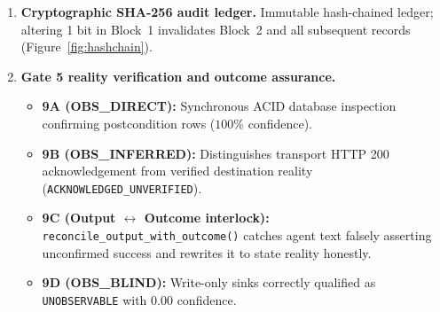 \documentclass[11pt,a4paper]{article}
\begin{document}
\begin{enumerate}[leftmargin=*,itemsep=2pt]
  \item \textbf{Cryptographic SHA-256 audit ledger.} Immutable hash-chained ledger; altering 1 bit in Block~1 invalidates Block~2 and all subsequent records (Figure~\ref{fig:hashchain}).
  \item \textbf{Gate 5 reality verification and outcome assurance.}
    \begin{itemize}[leftmargin=*,itemsep=1pt]
      \item \textbf{9A (OBS\_DIRECT):} Synchronous ACID database inspection confirming postcondition rows ($100\%$ confidence).
      \item \textbf{9B (OBS\_INFERRED):} Distinguishes transport HTTP 200 acknowledgement from verified destination reality (\texttt{ACKNOWLEDGED\_UNVERIFIED}).
      \item \textbf{9C (Output $\leftrightarrow$ Outcome interlock):} \texttt{reconcile\_output\_with\_outcome()} catches agent text falsely asserting unconfirmed success and rewrites it to state reality honestly.
      \item \textbf{9D (OBS\_BLIND):} Write-only sinks correctly qualified as \texttt{UNOBSERVABLE} with $0.00$ confidence.
    \end{itemize}
\end{enumerate}

\end{document}

